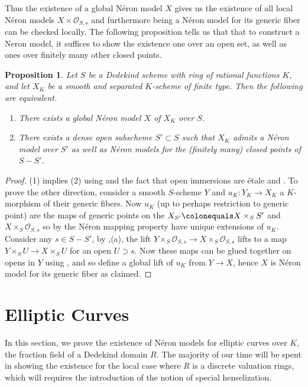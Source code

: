 \documentclass{article}
\theoremstyle{definition}
\theoremstyle{remark}
\theoremstyle{plain}
\newtheorem{proposition}[theorem]{Proposition}
\newcommand{\mc}[1]{\mathcal{#1}}
\begin{document}
Thus the existence of a global N\'eron model $X$ gives us the existence of all local N\'eron models $X \times \mc{O}_{S,s}$ and furthermore being a N\'eron model for its generic fiber can be checked locally.
The following proposition tells us that that to construct a Neron model, it suffices to show the existence one over an open set, as well as ones over finitely many other closed points.

\begin{proposition}\label{prop:2.11}
	Let $S$ be a Dedekind scheme with ring of rational functions $K$, and let $X_K$ be a smooth and separated $K$-scheme of finite type.
	Then the following are equivalent.
\begin{enumerate}
	\item There exists a global N\'eron model $X$ of $X_K$ over $S$.
	\item There exists a dense open subscheme $S' \subset S$ such that $X_K$ admits a N\'eron model over $S'$ as well as N\'eron models for the (finitely many) closed points of $S - S'$.
\end{enumerate}
\end{proposition}

\begin{proof}
	(1) implies (2) using  and the fact that open immersions are \'etale and .
	To prove the other direction, consider a smooth $S$-scheme $Y$ and $u_K: Y_K \to X_K$ a $K$-morphism of their generic fibers. 
	Now $u_K$ (up to perhaps restriction to generic point) are the maps of generic points on the $X_{S'} \colonequals X \times_S S'$ and $X \times_S \mc{O}_{S,s}$ so by the N\'eron mapping property have unique extensions of $u_K$.
	Consider any $s \in S - S'$, by ,(a), the lift $Y \times_S \mc{O}_{S,s} \to X \times_S \mc{O}_{S,s}$ lifts to a map $Y \times_S U \to X \times_S U$ for an open $U \supset s$.
	Now these maps can be glued together on opens in $Y$ using , and so define a global lift of $u_K$ from $Y \to X$, hence $X$ is N\'eron model for its generic fiber as claimed.
\end{proof}


\section{Elliptic Curves}

In this section, we prove the existence of N\'eron models for elliptic curves over $K$, the fraction field of a Dedekind domain $R$. 
The majority of our time will be spent in showing the existence for the local case where $R$ is a discrete valuation rings, which will requires the introduction of the notion of special henselization. \newline
\end{document}
